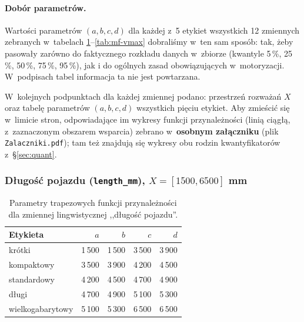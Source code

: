 \documentclass{article}
\begin{document}
\paragraph{Dobór parametrów.} Wartości parametrów $(a,b,c,d)$ dla
każdej z~5 etykiet wszystkich 12 zmiennych zebranych w~tabelach
\ref{tab:mf-length}--\ref{tab:mf-vmax} dobraliśmy w~ten sam sposób:
tak, żeby pasowały zarówno do faktycznego rozkładu danych w~zbiorze
(kwantyle 5\,\%, 25\,\%, 50\,\%, 75\,\%, 95\,\%), jak i do
ogólnych zasad obowiązujących w~motoryzacji. W~podpisach tabel
informacja ta nie jest powtarzana.

W~kolejnych podpunktach dla każdej zmiennej podano: przestrzeń rozważań
$X$ oraz tabelę parametrów $(a,b,c,d)$ wszystkich pięciu etykiet.
Aby zmieścić się w~limicie stron, odpowiadające im wykresy funkcji
przynależności (linią ciągłą, z~zaznaczonym obszarem wsparcia)
zebrano w~\textbf{osobnym załączniku} (plik \texttt{Zalaczniki.pdf}); tam
też znajdują się wykresy obu rodzin kwantyfikatorów z~\S\ref{sec:quant}.


\subsubsection{Długość pojazdu (\texttt{length\_mm}), $X = [1500, 6500]$ mm}
\begin{table}[H]
\centering
\caption{Parametry trapezowych funkcji przynależności dla zmiennej
lingwistycznej ,,długość pojazdu''.}
\label{tab:mf-length}
\begin{tabular}{l r r r r}
\toprule
Etykieta & $a$ & $b$ & $c$ & $d$ \\
\midrule
krótki            & 1\,500 & 1\,500 & 3\,500 & 3\,900 \\
kompaktowy        & 3\,500 & 3\,900 & 4\,200 & 4\,500 \\
standardowy       & 4\,200 & 4\,500 & 4\,700 & 4\,900 \\
długi             & 4\,700 & 4\,900 & 5\,100 & 5\,300 \\
wielkogabarytowy  & 5\,100 & 5\,300 & 6\,500 & 6\,500 \\
\bottomrule
\end{tabular}
\end{table}
\end{document}
